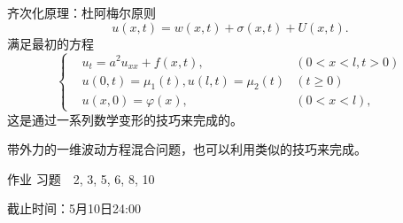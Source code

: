 \documentclass[11pt]{beamer}
\newcommand{\kong}[1][0.5]{\vspace{#1cm}}
\begin{document}
\begin{frame}{齐次化原理：杜阿梅尔原则}
\begin{equation}
u(x,t) = w(x,t) + \sigma(x,t) + U(x,t).
\end{equation}
满足最初的方程
\begin{equation}
\left\{
\begin{aligned}
& u_t = a^2 u_{xx} + f(x,t), ~~  & ( 0 < x < l, t>0) \\
& u(0,t) = \mu_1 (t), u(l,t) = \mu_2 (t) & ( t \geq 0) \\
& u(x,0) = \varphi(x), ~~ & ( 0 <x< l ),
\end{aligned}
\right.
\end{equation}
这是通过一系列数学变形的技巧来完成的。

带外力的一维波动方程混合问题，也可以利用类似的技巧来完成。
\end{frame}

\begin{frame}{作业}
\kong[1]
习题　2, 3, 5, 6, 8, 10

\kong[1]
截止时间：5月10日24:00
\kong[1]
\end{frame}
\end{document}
